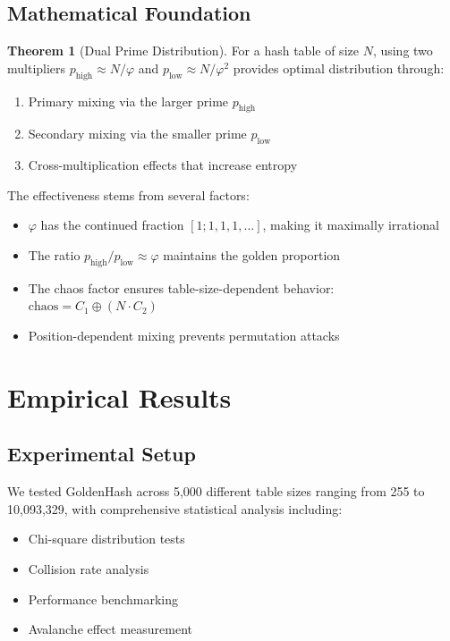 \documentclass[11pt,a4paper]{article}
\theoremstyle{definition}
\newtheorem{theorem}{Theorem}
\begin{document}
\subsection{Mathematical Foundation}

\begin{theorem}[Dual Prime Distribution]
For a hash table of size $N$, using two multipliers $p_{\text{high}} \approx N/\varphi$ and $p_{\text{low}} \approx N/\varphi^2$ provides optimal distribution through:
\begin{enumerate}
\item Primary mixing via the larger prime $p_{\text{high}}$
\item Secondary mixing via the smaller prime $p_{\text{low}}$
\item Cross-multiplication effects that increase entropy
\end{enumerate}
\end{theorem}

The effectiveness stems from several factors:
\begin{itemize}
\item $\varphi$ has the continued fraction $[1; 1, 1, 1, \ldots]$, making it maximally irrational
\item The ratio $p_{\text{high}}/p_{\text{low}} \approx \varphi$ maintains the golden proportion
\item The chaos factor ensures table-size-dependent behavior: $\text{chaos} = C_1 \oplus (N \cdot C_2)$
\item Position-dependent mixing prevents permutation attacks
\end{itemize}

\section{Empirical Results}

\subsection{Experimental Setup}

We tested GoldenHash across 5,000 different table sizes ranging from 255 to 10,093,329, with comprehensive statistical analysis including:
\begin{itemize}
\item Chi-square distribution tests
\item Collision rate analysis
\item Performance benchmarking
\item Avalanche effect measurement
\end{itemize}
\end{document}
